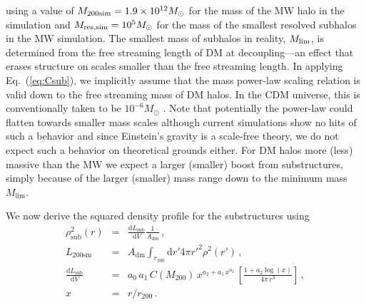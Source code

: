 \documentclass[10pt,aps,pra,reprint,amsmath,amsfonts,amssymb,showpacs,nofootinbib,floatfix]{revtex4-1}
\newcommand{\rmn}{\mathrm}
\newcommand{\msun}{M_\odot}
\newcommand{\sm}{\rmn{sm}}
\newcommand{\dd}{\rmn{d}}
\newcommand{\rvir}{r_{200}}
\newcommand{\mvir}{M_{200}}
\begin{document}
\cite{2008Natur.456...73S} using a value of $M_{\rm
  200sim}=1.9\times10^{12}\msun$ for the mass of the MW halo in the
simulation and $M_{\rm res,sim}=10^5\msun$ for the mass of the
smallest resolved subhalos in the MW simulation.  The smallest mass of
subhalos in reality, $M_{\rm lim}$, is determined from the free
streaming length of DM at decoupling---an effect that erases structure
on scales smaller than the free streaming length. In applying
Eq.~(\ref{eq:Csub}), we implicitly assume that the mass power-law
scaling relation is valid down to the free streaming mass of DM
halos. In the CDM universe, this is conventionally taken to be
$10^{-6}\msun$ \cite{2001PhRvD..64h3507H, 2005JCAP...08..003G}. Note
that potentially the power-law could flatten towards smaller mass
scales although current simulations show no hits of such a behavior
and since Einstein's gravity is a scale-free theory, we do not expect
such a behavior on theoretical grounds either.  For DM halos more
(less) massive than the MW we expect a larger (smaller) boost from
substructures, simply because of the larger (smaller) mass range down
to the minimum mass $M_\rmn{lim}$.

We now derive the squared density profile for the substructures
using
\begin{eqnarray}
\rho_\rmn{sub}^2(r) &=& \frac{\dd L_\rmn{sub}}{\dd V} \frac{1}{A_{\rmn{dm}}}\,,\label{eq:rho_sub}\\
L_{200\sm} &=&  A_{\rmn{dm}} \int_{\rvir} \dd r' 4\pi r'^2 \rho^2(r')\,,\label{eq:Lsm}\\
 \frac{\dd L_\rmn{sub}}{\dd V} &=& a_0\,a_1\,C(\mvir)\,x^{a_2+a_1\,x^{a_2}}\,
\left[\frac{1+a_2\log(x)}{4\pi\,r^3}\right]\,,\\
x &=& r/\rvir\,.\label{eq:xvir}
\end{eqnarray} 
\end{document}
